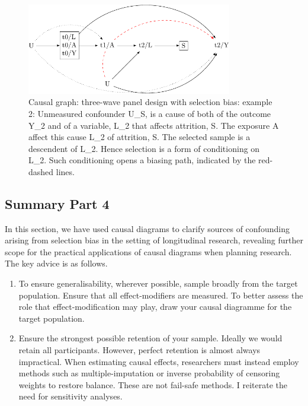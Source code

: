 \documentclass[
  singlecolumn]{report}
\begin{document}
\begin{figure}

{\centering \includegraphics[width=0.8\textwidth,height=\textheight]{causal-dags_files/figure-pdf/fig-dag-8-2-1.pdf}

}

\caption{\label{fig-dag-8-2}Causal graph: three-wave panel design with
selection bias: example 2: Unmeasured confounder U\_S, is a cause of
both of the outcome Y\_2 and of a variable, L\_2 that affects attrition,
S. The exposure A affect this cause L\_2 of attrition, S. The selected
sample is a descendent of L\_2. Hence selection is a form of
conditioning on L\_2. Such conditioning opens a biasing path, indicated
by the red-dashed lines.}

\end{figure}

\hypertarget{summary-part-4}{%
\subsection{Summary Part 4}\label{summary-part-4}}

In this section, we have used causal diagrams to clarify sources of
confounding arising from selection bias in the setting of longitudinal
research, revealing further scope for the practical applications of
causal diagrams when planning research. The key advice is as follows.

\begin{enumerate}
\def\labelenumi{\arabic{enumi}.}
\item
  To ensure generalisability, wherever possible, sample broadly from the
  target population. Ensure that all effect-modifiers are measured. To
  better assess the role that effect-modification may play, draw your
  causal diagramme for the target population.
\item
  Ensure the strongest possible retention of your sample. Ideally we
  would retain all participants. However, perfect retention is almost
  always impractical. When estimating causal effects, researchers must
  instead employ methods such as multiple-imputation or inverse
  probability of censoring weights to restore balance. These are not
  fail-safe methods. I reiterate the need for sensitivity analyses.
\end{enumerate}
\end{document}

